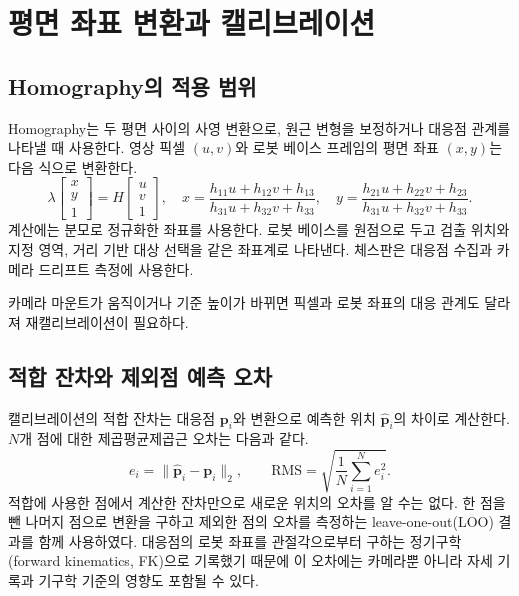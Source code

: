 \section{평면 좌표 변환과 캘리브레이션}
\subsection{Homography의 적용 범위}
Homography는 두 평면 사이의 사영 변환으로, 원근 변형을 보정하거나 대응점 관계를 나타낼 때 사용한다\cite{opencv-homography}. 영상 픽셀 $(u,v)$와 로봇 베이스 프레임의 평면 좌표 $(x,y)$는 다음 식으로 변환한다.
\begin{equation}
 \lambda\begin{bmatrix}x\\y\\1\end{bmatrix}
 =H\begin{bmatrix}u\\v\\1\end{bmatrix},\quad
 x=\frac{h_{11}u+h_{12}v+h_{13}}{h_{31}u+h_{32}v+h_{33}},\quad
 y=\frac{h_{21}u+h_{22}v+h_{23}}{h_{31}u+h_{32}v+h_{33}}.
\end{equation}
계산에는 분모로 정규화한 좌표를 사용한다. 로봇 베이스를 원점으로 두고 검출 위치와 지정 영역, 거리 기반 대상 선택을 같은 좌표계로 나타낸다. 체스판은 대응점 수집과 카메라 드리프트 측정에 사용한다.

카메라 마운트가 움직이거나 기준 높이가 바뀌면 픽셀과 로봇 좌표의 대응 관계도 달라져 재캘리브레이션이 필요하다.

\subsection{적합 잔차와 제외점 예측 오차}
캘리브레이션의 적합 잔차는 대응점 $\boldsymbol{p}_i$와 변환으로 예측한 위치 $\hat{\boldsymbol{p}}_i$의 차이로 계산한다. $N$개 점에 대한 제곱평균제곱근 오차는 다음과 같다.
\begin{equation}
 e_i=\|\hat{\boldsymbol{p}}_i-\boldsymbol{p}_i\|_2,\qquad
 \mathrm{RMS}=\sqrt{\frac{1}{N}\sum_{i=1}^{N} e_i^2}.
\end{equation}
적합에 사용한 점에서 계산한 잔차만으로 새로운 위치의 오차를 알 수는 없다. 한 점을 뺀 나머지 점으로 변환을 구하고 제외한 점의 오차를 측정하는 leave-one-out(LOO) 결과를 함께 사용하였다. 대응점의 로봇 좌표를 관절각으로부터 구하는 정기구학(forward kinematics, FK)으로 기록했기 때문에 이 오차에는 카메라뿐 아니라 자세 기록과 기구학 기준의 영향도 포함될 수 있다.

